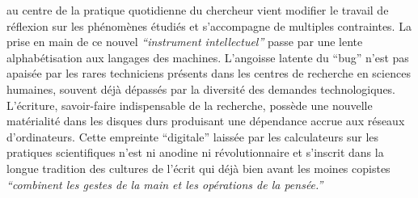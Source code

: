 au centre de la pratique quotidienne du chercheur vient modifier le
travail de r\'eflexion sur les ph\'enom\`enes \'etudi\'es et
s{\textquoteright}accompagne de multiples contraintes. La prise en main
de ce nouvel \textit{{\textquotedblleft}instrument
intellectuel{\textquotedblright} }\cite{Guichard2014} passe par une lente
alphab\'etisation aux langages des machines. L{\textquoteright}angoisse
latente du {\textquotedblleft}bug{\textquotedblright}
n{\textquoteright}est pas apais\'ee par les rares techniciens
pr\'esents dans les centres de recherche en sciences humaines, souvent
d\'ej\`a d\'epass\'es par la diversit\'e des demandes technologiques.
L{\textquoteright}\'ecriture, savoir-faire indispensable de la
recherche, poss\`ede une nouvelle mat\'erialit\'e dans les disques durs
produisant une d\'ependance accrue aux r\'eseaux
d{\textquoteright}ordinateurs. Cette empreinte
{\textquotedblleft}digitale{\textquotedblright} laiss\'ee par les
calculateurs sur les pratiques scientifiques n{\textquoteright}est ni
anodine ni r\'evolutionnaire et s{\textquoteright}inscrit dans la
longue tradition des cultures de l{\textquoteright}\'ecrit qui d\'ej\`a
bien avant les moines copistes \textit{{\textquotedblleft}combinent les
gestes de la main et les op\'erations de la
pens\'ee.{\textquotedblright}} \cite{Jacob2011} 

